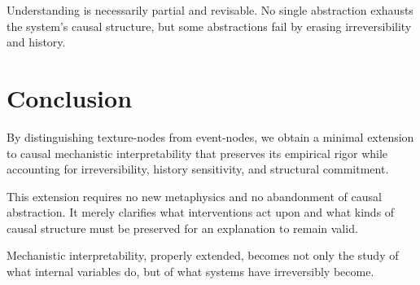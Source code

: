 \documentclass[11pt]{article}
\begin{document}
Understanding is necessarily partial and revisable. No single abstraction
exhausts the system’s causal structure, but some abstractions fail by erasing
irreversibility and history.

\section{Conclusion}

By distinguishing texture-nodes from event-nodes, we obtain a minimal extension
to causal mechanistic interpretability that preserves its empirical rigor while
accounting for irreversibility, history sensitivity, and structural commitment.

This extension requires no new metaphysics and no abandonment of causal
abstraction. It merely clarifies what interventions act upon and what kinds of
causal structure must be preserved for an explanation to remain valid.

Mechanistic interpretability, properly extended, becomes not only the study of
what internal variables do, but of what systems have irreversibly become.
\end{document}
